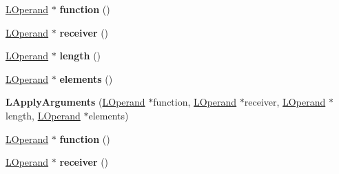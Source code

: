 \begin{DoxyCompactItemize}
\item 
\hyperlink{classv8_1_1internal_1_1_l_operand}{L\+Operand} $\ast$ {\bfseries function} ()\hypertarget{classv8_1_1internal_1_1_l_apply_arguments_af7fa90a86d06b14c9991f9c68115415b}{}\label{classv8_1_1internal_1_1_l_apply_arguments_af7fa90a86d06b14c9991f9c68115415b}

\item 
\hyperlink{classv8_1_1internal_1_1_l_operand}{L\+Operand} $\ast$ {\bfseries receiver} ()\hypertarget{classv8_1_1internal_1_1_l_apply_arguments_a6cd58169b6ce998cb4a7fadaebdf8ae5}{}\label{classv8_1_1internal_1_1_l_apply_arguments_a6cd58169b6ce998cb4a7fadaebdf8ae5}

\item 
\hyperlink{classv8_1_1internal_1_1_l_operand}{L\+Operand} $\ast$ {\bfseries length} ()\hypertarget{classv8_1_1internal_1_1_l_apply_arguments_a7184d82b892039d6cd4cae3b4d9f3f9d}{}\label{classv8_1_1internal_1_1_l_apply_arguments_a7184d82b892039d6cd4cae3b4d9f3f9d}

\item 
\hyperlink{classv8_1_1internal_1_1_l_operand}{L\+Operand} $\ast$ {\bfseries elements} ()\hypertarget{classv8_1_1internal_1_1_l_apply_arguments_acb08ae582ad76ef25684e2361409c0e4}{}\label{classv8_1_1internal_1_1_l_apply_arguments_acb08ae582ad76ef25684e2361409c0e4}

\item 
{\bfseries L\+Apply\+Arguments} (\hyperlink{classv8_1_1internal_1_1_l_operand}{L\+Operand} $\ast$function, \hyperlink{classv8_1_1internal_1_1_l_operand}{L\+Operand} $\ast$receiver, \hyperlink{classv8_1_1internal_1_1_l_operand}{L\+Operand} $\ast$length, \hyperlink{classv8_1_1internal_1_1_l_operand}{L\+Operand} $\ast$elements)\hypertarget{classv8_1_1internal_1_1_l_apply_arguments_a03722f1b30078ec905687e48dd73c80d}{}\label{classv8_1_1internal_1_1_l_apply_arguments_a03722f1b30078ec905687e48dd73c80d}

\item 
\hyperlink{classv8_1_1internal_1_1_l_operand}{L\+Operand} $\ast$ {\bfseries function} ()\hypertarget{classv8_1_1internal_1_1_l_apply_arguments_af7fa90a86d06b14c9991f9c68115415b}{}\label{classv8_1_1internal_1_1_l_apply_arguments_af7fa90a86d06b14c9991f9c68115415b}

\item 
\hyperlink{classv8_1_1internal_1_1_l_operand}{L\+Operand} $\ast$ {\bfseries receiver} ()\hypertarget{classv8_1_1internal_1_1_l_apply_arguments_a6cd58169b6ce998cb4a7fadaebdf8ae5}{}\label{classv8_1_1internal_1_1_l_apply_arguments_a6cd58169b6ce998cb4a7fadaebdf8ae5}


\end{DoxyCompactItemize}
